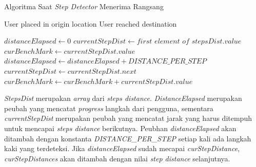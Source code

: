 \begin{algorithm}
	\caption{Algoritma Saat \textit{Step Detector} Menerima Rangsang}
	\label{alg:algoritma-step-detector}
	\begin{algorithmic}[1]
	\Require User placed in origin location	
	\Ensure User reached destination
	
		\State $distanceElapsed \gets 0$ 
		\State $currentStepDist \gets first$ $element$ $of$ $stepsDist.value$
		\State $curBenchMark \gets currentStepDist.value$
    		\State $distanceElapsed \gets distanceElapsed + DISTANCE\_PER\_STEP$
    			\State $currentStepDist \gets currentStepDist.next$    			
				\State $curBenchMark \gets curBenchMark + currentStepDist.value$
				
    			\EndIf
    		\EndIf
    	\EndIf
	\EndFunction  
	\end{algorithmic}
\end{algorithm}

\textit{StepsDist} merupakan \textit{array} dari \textit{steps distance}. \textit{DistanceElapsed} merupakan peubah yang mencatat \textit{progress} langkah dari pengguna, sementara \textit{currentStepDist} merupakan peubah yang mencatat jarak yang harus ditempuh untuk mencapai \textit{steps distance} berikutnya.
Peubhan \textit{distanceElapsed} akan ditambah dengan konstanta \textit{DISTANCE\_PER\_STEP} setiap kali ada langkah kaki yang terdeteksi.
Jika \textit{distanceElapsed} sudah mecapai \textit{curStepDistance}, \textit{curStepDistances} akan ditambah dengan nilai \textit{step distance} selanjutnya. 